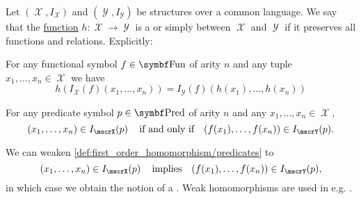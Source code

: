 \begin{definition}\label{def:first_order_homomorphism}\mcite\cite[def. 23.8]{OpenLogic20201202}
  Let \( (\mscrX, I_{\mscrX}) \) and \( (\mscrY, I_{\mscrY}) \) be structures over a common language. We say that the \hyperref[def:function]{function} \( h: \mscrX \to \mscrY \) is a  or simply  between \( \mscrX \) and \( \mscrY \) if it preserves all functions and relations. Explicitly:
  \begin{defenum}
     For any functional symbol \( f \in \bfop{Fun} \) of arity \( n \) and any tuple \( x_1, \ldots, x_n \in \mscrX \) we have
    \begin{equation}\label{eq:def:first_order_homomorphism/functions}
      h(I_{\mscrX}(f)(x_1, \ldots, x_n)) = I_{\mscrY}(f)(h(x_1), \ldots, h(x_n))
    \end{equation}

     For any predicate symbol \( p \in \bfop{Pred} \) of arity \( n \) and any \( x_1, \ldots, x_n \in \mscrX \),
    \begin{equation}\label{eq:def:first_order_homomorphism/predicates}
      (x_1, \ldots, x_n) \in I_{\mscrX}(p) \quad\T{if and only if}\quad (f(x_1), \ldots, f(x_n)) \in I_{\mscrY}(p).
    \end{equation}

     We can weaken \ref{def:first_order_homomorphism/predicates} to
    \begin{equation}\label{eq:def:first_order_homomorphism/predicates_weak}
      (x_1, \ldots, x_n) \in I_{\mscrX}(p) \quad\T{implies}\quad (f(x_1), \ldots, f(x_n)) \in I_{\mscrY}(p),
    \end{equation}
    in which case we obtain the notion of a . Weak homomorphisms are used in e.g. .
  \end{defenum}
\end{definition}

